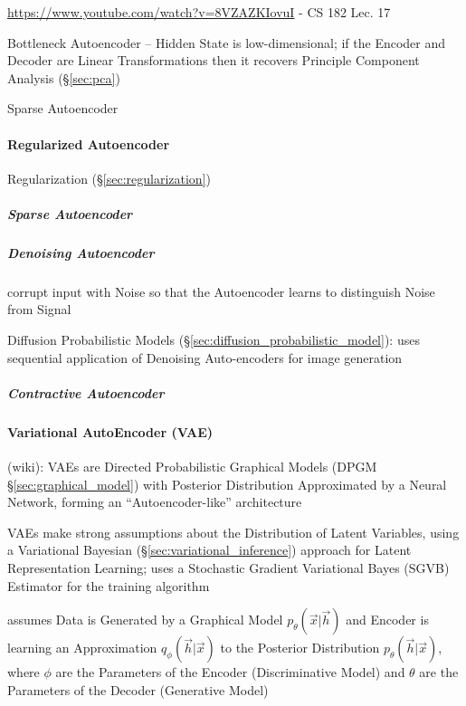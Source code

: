 \url{https://www.youtube.com/watch?v=8VZAZKIovuI} - CS 182 Lec. 17

Bottleneck Autoencoder -- Hidden State is low-dimensional; if the Encoder and
Decoder are Linear Transformations then it recovers Principle Component Analysis
(\S\ref{sec:pca})

Sparse Autoencoder



\paragraph{Regularized Autoencoder}\label{sec:regularized_autoencoder}\hfill

\fist Regularization (\S\ref{sec:regularization})



\subparagraph{Sparse Autoencoder}\label{sec:sparse_autoencoder}\hfill

\subparagraph{Denoising Autoencoder}\label{sec:denoising_autoencoder}\hfill

corrupt input with Noise so that the Autoencoder learns to distinguish Noise
from Signal

Diffusion Probabilistic Models (\S\ref{sec:diffusion_probabilistic_model}):
uses sequential application of Denoising Auto-encoders for image generation



\subparagraph{Contractive Autoencoder}\label{sec:contractive_autoencoder}\hfill



\paragraph{Variational AutoEncoder (VAE)}\label{sec:vae}\hfill

(wiki): VAEs are Directed Probabilistic Graphical Models (DPGM
\S\ref{sec:graphical_model}) with Posterior Distribution Approximated by a
Neural Network, forming an ``Autoencoder-like'' architecture

VAEs make strong assumptions about the Distribution of Latent Variables, using a
Variational Bayesian (\S\ref{sec:variational_inference}) approach for Latent
Representation Learning; uses a Stochastic Gradient Variational Bayes (SGVB)
Estimator for the training algorithm

assumes Data is Generated by a Graphical Model $p_\theta(\vec{x} | \vec{h})$ and
Encoder is learning an Approximation $q_\phi(\vec{h} | \vec{x})$ to the
Posterior Distribution $p_\theta(\vec{h} | \vec{x})$, where $\phi$ are the
Parameters of the Encoder (Discriminative Model) and $\theta$ are the Parameters
of the Decoder (Generative Model)

